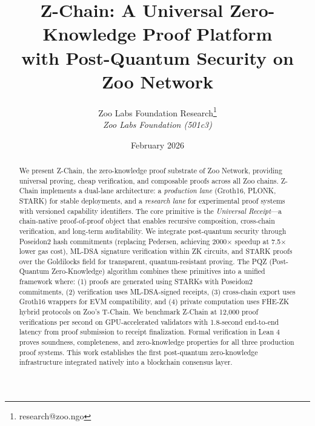 \documentclass[11pt,a4paper]{article}
\title{\textbf{Z-Chain: A Universal Zero-Knowledge Proof Platform\\with Post-Quantum Security on Zoo Network}}
\author{
Zoo Labs Foundation Research\thanks{research@zoo.ngo}\\
\textit{Zoo Labs Foundation (501c3)}
}
\date{February 2026}
\begin{document}
\zoocoverpage
\maketitle

\begin{abstract}
We present Z-Chain, the zero-knowledge proof substrate of Zoo Network, providing universal proving, cheap verification, and composable proofs across all Zoo chains. Z-Chain implements a dual-lane architecture: a \emph{production lane} (Groth16, PLONK, STARK) for stable deployments, and a \emph{research lane} for experimental proof systems with versioned capability identifiers. The core primitive is the \emph{Universal Receipt}---a chain-native proof-of-proof object that enables recursive composition, cross-chain verification, and long-term auditability. We integrate post-quantum security through Poseidon2 hash commitments (replacing Pedersen, achieving 2000$\times$ speedup at 7.5$\times$ lower gas cost), ML-DSA signature verification within ZK circuits, and STARK proofs over the Goldilocks field for transparent, quantum-resistant proving. The PQZ (Post-Quantum Zero-Knowledge) algorithm combines these primitives into a unified framework where: (1) proofs are generated using STARKs with Poseidon2 commitments, (2) verification uses ML-DSA-signed receipts, (3) cross-chain export uses Groth16 wrappers for EVM compatibility, and (4) private computation uses FHE-ZK hybrid protocols on Zoo's T-Chain. We benchmark Z-Chain at 12,000 proof verifications per second on GPU-accelerated validators with 1.8-second end-to-end latency from proof submission to receipt finalization. Formal verification in Lean 4 proves soundness, completeness, and zero-knowledge properties for all three production proof systems. This work establishes the first post-quantum zero-knowledge infrastructure integrated natively into a blockchain consensus layer.
\end{abstract}










\end{document}
